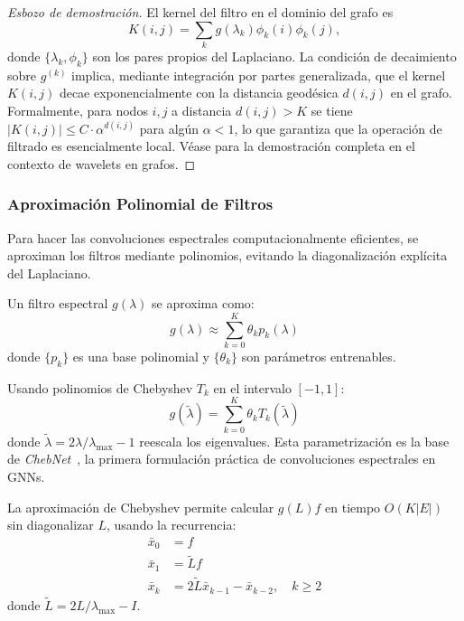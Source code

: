 \begin{proof}[Esbozo de demostración]
El kernel del filtro en el dominio del grafo es
\[
K(i,j) = \sum_k g(\lambda_k) \phi_k(i) \phi_k(j),
\]
donde $\{\lambda_k, \phi_k\}$ son los pares propios del Laplaciano. La condición de decaimiento sobre $g^{(k)}$ implica, mediante integración por partes generalizada, que el kernel $K(i,j)$ decae exponencialmente con la distancia geodésica $d(i,j)$ en el grafo. Formalmente, para nodos $i,j$ a distancia $d(i,j) > K$ se tiene $|K(i,j)| \leq C \cdot \alpha^{d(i,j)}$ para algún $\alpha < 1$, lo que garantiza que la operación de filtrado es esencialmente local. Véase \citep[Theorem~5.5]{hammond2011wavelets} para la demostración completa en el contexto de wavelets en grafos.
\end{proof}

\subsubsection{Aproximación Polinomial de Filtros}

Para hacer las convoluciones espectrales computacionalmente eficientes, se aproximan los filtros mediante polinomios, evitando la diagonalización explícita del Laplaciano.

\begin{definition}\label{def:filtros_polinomiales}
Un filtro espectral $g(\lambda)$ se aproxima como:
\begin{equation}
g(\lambda) \approx \sum_{k=0}^K \theta_k p_k(\lambda)
\end{equation}
donde $\{p_k\}$ es una base polinomial y $\{\theta_k\}$ son parámetros entrenables.
\end{definition}

\begin{example}\label{ex:chebyshev_aproximacion}
Usando polinomios de Chebyshev $T_k$ en el intervalo $[-1, 1]$:
\begin{equation}
g(\tilde{\lambda}) = \sum_{k=0}^K \theta_k T_k(\tilde{\lambda})
\end{equation}
donde $\tilde{\lambda} = 2\lambda/\lambda_{\max} - 1$ reescala los eigenvalues. Esta parametrización es la base de \textit{ChebNet}~\citep{defferrard2017convolutionalneuralnetworksgraphs}, la primera formulación práctica de convoluciones espectrales en \glspl{GNN}.
\end{example}

\begin{theorem}\label{thm:eficiencia_chebyshev}
La aproximación de Chebyshev permite calcular $g(L)f$ en tiempo $O(K|E|)$ sin diagonalizar $L$, usando la recurrencia:
\begin{align}
\bar{x}_0 &= f \\
\bar{x}_1 &= \tilde{L} f \\
\bar{x}_k &= 2\tilde{L}\bar{x}_{k-1} - \bar{x}_{k-2}, \quad k \geq 2
\end{align}
donde $\tilde{L} = 2L/\lambda_{\max} - I$.
\end{theorem}

